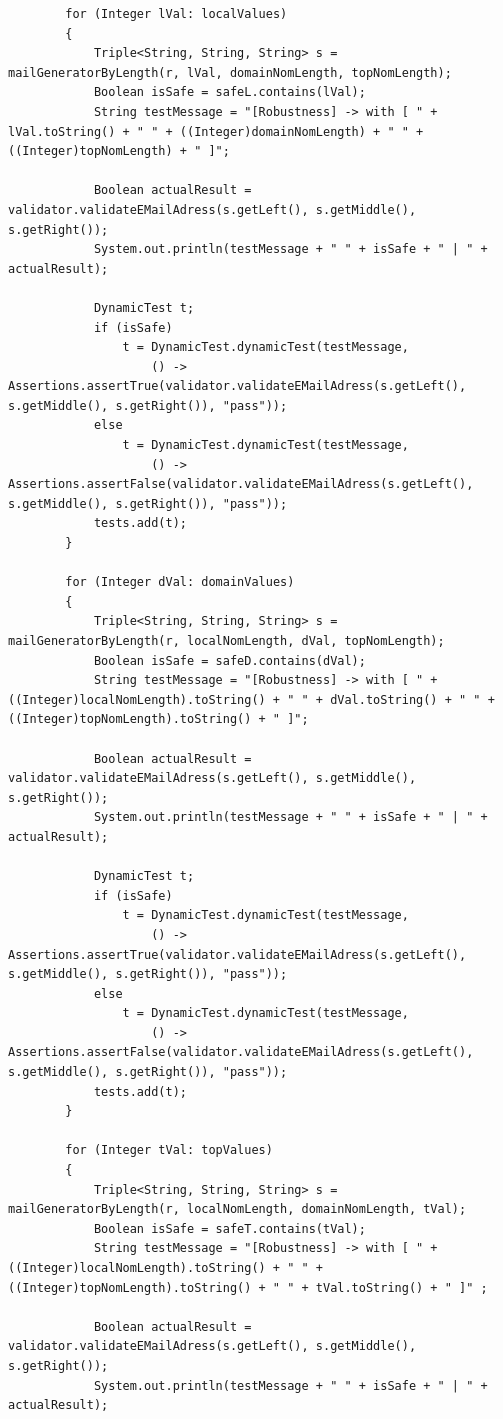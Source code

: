 \documentclass[a4paper,9pt,oneside]{scrreprt}
\begin{document}
\begin{lstlisting}
		for (Integer lVal: localValues) 
		{
			Triple<String, String, String> s = mailGeneratorByLength(r, lVal, domainNomLength, topNomLength);
			Boolean isSafe = safeL.contains(lVal);
			String testMessage = "[Robustness] -> with [ " + lVal.toString() + " " + ((Integer)domainNomLength) + " " + ((Integer)topNomLength) + " ]";
			
			Boolean actualResult = validator.validateEMailAdress(s.getLeft(), s.getMiddle(), s.getRight());
			System.out.println(testMessage + " " + isSafe + " | " + actualResult);
			
			DynamicTest t;
			if (isSafe)
				t = DynamicTest.dynamicTest(testMessage,
					() -> Assertions.assertTrue(validator.validateEMailAdress(s.getLeft(), s.getMiddle(), s.getRight()), "pass"));
			else
				t = DynamicTest.dynamicTest(testMessage,
					() -> Assertions.assertFalse(validator.validateEMailAdress(s.getLeft(), s.getMiddle(), s.getRight()), "pass"));
			tests.add(t);
		}
	
		for (Integer dVal: domainValues) 
		{
			Triple<String, String, String> s = mailGeneratorByLength(r, localNomLength, dVal, topNomLength);
			Boolean isSafe = safeD.contains(dVal);
			String testMessage = "[Robustness] -> with [ " + ((Integer)localNomLength).toString() + " " + dVal.toString() + " " + ((Integer)topNomLength).toString() + " ]";
			
			Boolean actualResult = validator.validateEMailAdress(s.getLeft(), s.getMiddle(), s.getRight());
			System.out.println(testMessage + " " + isSafe + " | " + actualResult);
			
			DynamicTest t;
			if (isSafe)
				t = DynamicTest.dynamicTest(testMessage,
					() -> Assertions.assertTrue(validator.validateEMailAdress(s.getLeft(), s.getMiddle(), s.getRight()), "pass"));
			else
				t = DynamicTest.dynamicTest(testMessage,
					() -> Assertions.assertFalse(validator.validateEMailAdress(s.getLeft(), s.getMiddle(), s.getRight()), "pass"));
			tests.add(t);
		}
	
		for (Integer tVal: topValues) 
		{
			Triple<String, String, String> s = mailGeneratorByLength(r, localNomLength, domainNomLength, tVal);
			Boolean isSafe = safeT.contains(tVal);
			String testMessage = "[Robustness] -> with [ " + ((Integer)localNomLength).toString() + " " + ((Integer)topNomLength).toString() + " " + tVal.toString() + " ]" ;
			
			Boolean actualResult = validator.validateEMailAdress(s.getLeft(), s.getMiddle(), s.getRight());
			System.out.println(testMessage + " " + isSafe + " | " + actualResult);
			

\end{lstlisting}
\end{document}
